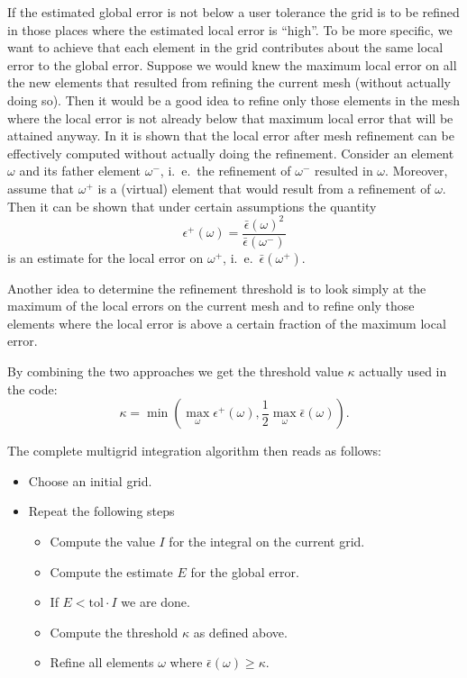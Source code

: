 \documentclass[11pt,a4paper,headinclude,footinclude,DIV16,normalheadings]{scrreprt}
\begin{document}
If the estimated global error is not below a user tolerance the grid
is to be refined in those places where the estimated local error is
``high''. To be more specific, we want to achieve that each element in
the grid contributes about the same local error to the global
error. Suppose we would knew the maximum local error on all the new elements
that resulted from refining the current mesh (without actually doing
so). Then it would be a good idea to refine only those elements in the
mesh where the local error is not already below that maximum local
error that will be attained anyway.
In \cite{Deuflhard93} it is shown that the local error after mesh
refinement can be effectively computed without actually doing the
refinement. Consider an element $\omega$ and its father element
$\omega^-$, i.~e.~the refinement of  $\omega^-$ resulted in
$\omega$. Moreover, assume that $\omega^+$ is a (virtual) element that
would result from a refinement of $\omega$. Then it can be shown that 
under certain assumptions the quantity
\begin{equation}
\epsilon^+(\omega) = \frac{\bar{\epsilon}(\omega)^2}{\bar{\epsilon}(\omega^-)}
\end{equation}
is an estimate for the local error on $\omega^+$,
i.~e.~$\bar{\epsilon}(\omega^+)$. 

Another idea to determine the refinement threshold is to look simply 
at the maximum of the local errors on the current mesh and
to refine only those elements where the local error is above a certain
fraction of the maximum local error.

By combining the two approaches we get the threshold value $\kappa$
actually used in the code:
\begin{equation}
\kappa = \min\left(\max\limits_{\omega} \epsilon^+(\omega), \frac12
  \max\limits_{\omega} \bar{\epsilon}(\omega) \right).
\end{equation}


The complete multigrid integration algorithm then reads as follows:
\begin{itemize}
\item Choose an initial grid.
\item Repeat the following steps
\begin{itemize}
\item Compute the value $I$ for the integral on the current grid.
\item Compute the estimate $E$ for the global error.
\item If $E<\text{tol}\cdot I$ we are done.
\item Compute the threshold $\kappa$ as defined above.
\item Refine all elements $\omega$ where $\bar{\epsilon}(\omega)\geq\kappa$.
\end{itemize}
\end{itemize}
\end{document}

